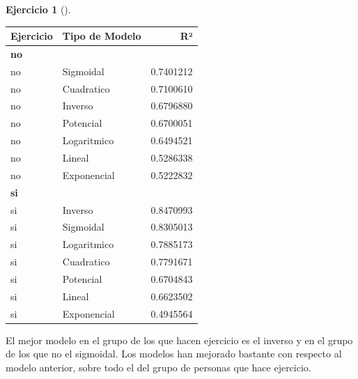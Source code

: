 \documentclass[
  a4paper,
]{scrreport}
\theoremstyle{definition}
\newtheorem{exercise}{Ejercicio}[chapter]
\theoremstyle{remark}
\begin{document}
\begin{exercise}[]
\begin{enumerate}
\begin{tcolorbox}
  \begin{table}
  \centering
  \begin{tabular}{l|l|r}
  \hline
  Ejercicio & Tipo de Modelo & R²\\
  \hline
  \multicolumn{3}{l}{\textbf{no}}\\
  \hline
  \hspace{1em}no & Sigmoidal & 0.7401212\\
  \hline
  \hspace{1em}no & Cuadratico & 0.7100610\\
  \hline
  \hspace{1em}no & Inverso & 0.6796880\\
  \hline
  \hspace{1em}no & Potencial & 0.6700051\\
  \hline
  \hspace{1em}no & Logaritmico & 0.6494521\\
  \hline
  \hspace{1em}no & Lineal & 0.5286338\\
  \hline
  \hspace{1em}no & Exponencial & 0.5222832\\
  \hline
  \multicolumn{3}{l}{\textbf{si}}\\
  \hline
  \hspace{1em}si & Inverso & 0.8470993\\
  \hline
  \hspace{1em}si & Sigmoidal & 0.8305013\\
  \hline
  \hspace{1em}si & Logaritmico & 0.7885173\\
  \hline
  \hspace{1em}si & Cuadratico & 0.7791671\\
  \hline
  \hspace{1em}si & Potencial & 0.6704843\\
  \hline
  \hspace{1em}si & Lineal & 0.6623502\\
  \hline
  \hspace{1em}si & Exponencial & 0.4945564\\
  \hline
  \end{tabular}
  \end{table}

  El mejor modelo en el grupo de los que hacen ejercicio es el inverso y
  en el grupo de los que no el sigmoidal. Los modelos han mejorado
  bastante con respecto al modelo anterior, sobre todo el del grupo de
  personas que hace ejercicio.


\end{tcolorbox}
\end{enumerate}
\end{exercise}
\end{document}
